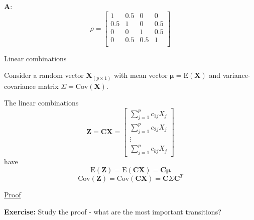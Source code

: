 \documentclass[ignorenonframetext,]{beamer}
\begin{document}
\begin{frame}

\textbf{A}: \[\rho=\left[ \begin{array}{cccc} 1&0.5&0&0\\
      0.5&1&0&0.5\\
      0&0&1&0.5\\
      0&0.5&0.5&1\\
          \end{array}
          \right]\]

\end{frame}

\begin{frame}

\begin{block}{Linear combinations}

Consider a random vector \(\mathbf{X}_{(p\times 1)}\) with mean vector
\(\mathbf{\mu}=\text{E}(\mathbf{X})\) and variance-covariance matrix
\(\Sigma=\text{Cov}(\mathbf{X})\).

The linear combinations
\[\mathbf{Z}=\mathbf{C}\mathbf{X}=\left[ \begin{array}{c} \sum_{j=1}^p c_{1j}X_j\\ \sum_{j=1}^p c_{2j}X_j\\ \vdots \\ \sum_{j=1}^p c_{kj}X_j \end{array} \right]\]
have
\[\text{E}(\mathbf{Z})=\text{E}(\mathbf{C}\mathbf{X})=\mathbf{C}\mathbf{\mu}\]
\[\text{Cov}(\mathbf{Z})=\text{Cov}(\mathbf{C}\mathbf{X})=
   \mathbf{C}\Sigma\mathbf{C}^T\]

\href{https://www.math.ntnu.no/emner/TMA4268/2018v/notes/CXproof.pdf}{Proof}

\textbf{Exercise:} Study the proof - what are the most important
transitions?

\end{block}

\end{frame}
\end{document}
